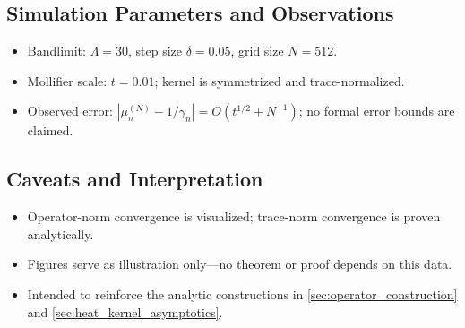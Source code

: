 \subsection*{Simulation Parameters and Observations}

\begin{itemize}
  \item Bandlimit: \( \Lambda = 30 \), step size \( \delta = 0.05 \), grid size \( N = 512 \).
  \item Mollifier scale: \( t = 0.01 \); kernel is symmetrized and trace-normalized.
  \item Observed error: \( |\mu_n^{(N)} - 1/\gamma_n| = O(t^{1/2} + N^{-1}) \); no formal error bounds are claimed.
\end{itemize}

\subsection*{Caveats and Interpretation}

\begin{itemize}
  \item Operator-norm convergence is visualized; trace-norm convergence is proven analytically.
  \item Figures serve as illustration only—no theorem or proof depends on this data.
  \item Intended to reinforce the analytic constructions in \cref{sec:operator_construction} and \cref{sec:heat_kernel_asymptotics}.
\end{itemize}
